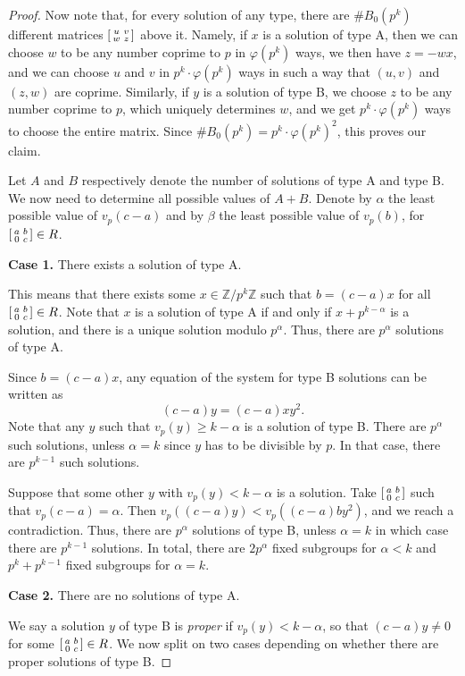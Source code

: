 \documentclass[10pt,leqno]{amsart}
\newcommand\sm[1]{\begin{bsmallmatrix}#1\end{bsmallmatrix}}
\newcommand{\Z}{\mathbb{Z}}
\theoremstyle{definition}
\theoremstyle{remark}
\numberwithin{theorem}{section}
\begin{document}
\begin{proof}
    Now note that, for every solution of any type, there are $\#B_0(p^k)$ different matrices $\sm{u & v \\w & z}$ above it. Namely, if $x$ is a solution of type A, then we can choose $w$ to be any number coprime to $p$ in $\varphi(p^k)$ ways, we then have $z=-wx$, and we can choose $u$ and $v$ in $p^k \cdot \varphi(p^k)$ ways in such a way that $(u,v)$ and $(z,w)$ are coprime. Similarly, if $y$ is a solution of type B, we choose $z$ to be any number coprime to $p$, which uniquely determines $w$, and we get $p^k\cdot \varphi(p^k)$ ways to choose the entire matrix. Since $\#B_0(p^k)=p^k\cdot \varphi(p^k)^2$, this proves our claim.

    Let $A$ and $B$ respectively denote the number of solutions of type A and type B. We now need to determine all possible values of $A+B$. Denote by $\alpha$ the least possible value of $v_p(c-a)$ and by $\beta$ the least possible value of $v_p(b)$, for $\sm{a & b \\0 & c} \in R$.

   \noindent \textbf{Case 1.} There exists a solution of type A.  
   
   This means that there exists some $x\in \Z/p^k\Z$ such that $b=(c-a)x$ for all $\sm{a & b \\ 0 & c}\in R$. Note that $x$ is a solution of type A if and only if $x+p^{k-\alpha}$ is a solution, and there is a unique solution modulo $p^\alpha$. Thus, there are $p^\alpha$ solutions of type A. 
    

    Since $b=(c-a)x$, any equation of the system for type B solutions can be written as $$(c-a)y=(c-a)xy^2.$$
    Note that any $y$ such that $v_p(y)\geq k-\alpha$ is a solution of type B. There are $p^\alpha$ such solutions, unless $\alpha=k$ since $y$ has to be divisible by $p$. In that case, there are $p^{k-1}$ such solutions.
    
    Suppose that some other $y$ with $v_p(y)<k-\alpha$ is a solution. Take $\sm{a & b \\0 & c}$ such that $v_p(c-a)=\alpha$. Then $v_p((c-a)y)<v_p((c-a)by^2)$, and we reach a contradiction. Thus, there are $p^\alpha$ solutions of type B, unless $\alpha=k$ in which case there are $p^{k-1}$ solutions. In total, there are $2p^\alpha$ fixed subgroups for $\alpha<k$ and $p^k+p^{k-1}$ fixed subgroups for $\alpha=k$.


\noindent \textbf{Case 2.} There are no solutions of type A. 

We say a solution $y$ of type B is \emph{proper} if $v_p(y)<k-\alpha$, so that $(c-a)y\neq 0$ for some $\sm{a & b \\0 & c} \in R$. We now split on two cases depending on whether there are proper solutions of type B.


\end{proof}
\end{document}
